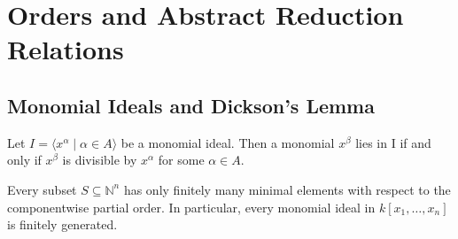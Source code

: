 \chapter{Orders and Abstract Reduction Relations} 

\section{Monomial Ideals and Dickson’s Lemma}

\begin{lemma}\label{lem:monomial_ideal}
    Let $I = \langle x^\alpha \mid \alpha \in A \rangle$ be a monomial ideal.
    Then a monomial $x^\beta$ lies in I if and only if $x^\beta$ is divisible by $x^\alpha$ for some $\alpha \in A$.
\end{lemma}

\begin{theorem}\label{thm:Dickson}
    Every subset $S\subseteq \mathbb{N}^n$ has only finitely many minimal elements with respect to the componentwise partial order. 
    In particular, every monomial ideal in $k[x_1,\dots,x_n]$ is finitely generated.
\end{theorem}